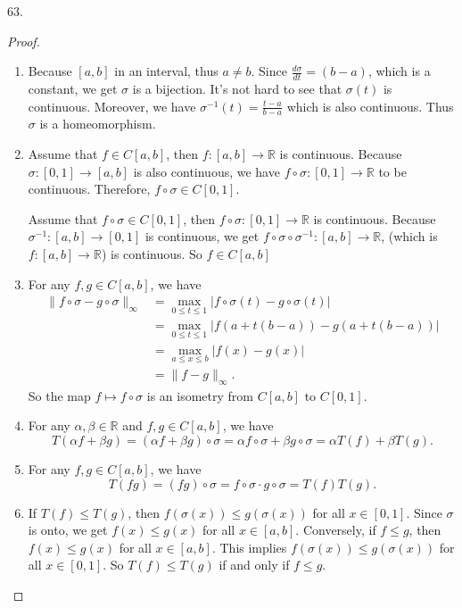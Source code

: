 \documentclass[12pt, a4paper]{article}
\theoremstyle{plain}
\newcommand{\R}{\mathbb{R}}
\begin{document}
\pagebreak

63.
\begin{proof}
\hfill

\begin{enumerate}[label=(\roman*)]
\item Because $[a,b]$ in an interval, thus $a\neq b$. Since $\frac{d\sigma}{dt}=(b-a)$, which is a constant, we get $\sigma$ is a bijection. It's not hard to see that $\sigma(t)$ is continuous. Moreover, we have $\sigma^{-1}(t)=\frac{t-a}{b-a}$ which is also continuous. Thus $\sigma$ is a homeomorphism.

\item Assume that $f\in C[a,b]$, then $f:[a,b]\rightarrow\R$ is continuous. Because $\sigma:[0,1]\rightarrow [a,b]$ is also continuous, we have $f\circ \sigma:[0,1]\rightarrow \R$ to be continuous. Therefore, $f\circ \sigma\in C[0,1]$. 

Assume that $f\circ\sigma\in C[0,1]$, then $f\circ\sigma:[0,1]\rightarrow \R$ is continuous. Because $\sigma^{-1}:[a,b]\rightarrow [0,1]$ is continuous, we get $f\circ\sigma\circ\sigma^{-1}:[a,b]\rightarrow\R$,  (which is $f:[a,b]\rightarrow\R$) is continuous. So $f\in C[a,b]$

\item For any $f,g\in C[a,b]$, we have
\begin{align*}
\|f\circ\sigma - g\circ\sigma\|_\infty &=\max_{0\leq t\leq 1}|f\circ \sigma(t)-g\circ\sigma (t)|\\
&=\max_{0\leq t\leq 1}|f(a+t(b-a))-g(a+t(b-a))|\\
&= \max_{a\leq x\leq b}|f(x)-g(x)|\\
&=\|f-g\|_\infty.
\end{align*}
So the map $f\mapsto f\circ\sigma$ is an isometry from $C[a,b]$ to $C[0,1]$.

\item For any $\alpha, \beta\in \R$ and $f,g\in C[a,b]$, we have
\[
T(\alpha f+\beta g)=(\alpha f+\beta g)\circ\sigma = \alpha f\circ \sigma+\beta g\circ\sigma=\alpha T(f)+\beta T(g).
\]

\item For any $f,g\in C[a,b]$, we have
\[
T(fg)=(fg)\circ\sigma=f\circ\sigma\cdot g\circ\sigma=T(f)T(g).
\]

\item If $T(f)\leq T(g)$, then $f(\sigma(x))\leq g(\sigma(x))$ for all $x\in [0,1]$. Since $\sigma$ is onto, we get $f(x)\leq g(x)$ for all $x\in [a,b]$. Conversely, if $f\leq g$, then $f(x)\leq g(x)$ for all $x\in [a,b]$. This implies $f(\sigma(x))\leq g(\sigma(x))$ for all $x\in [0,1]$. So $T(f)\leq T(g)$ if and only if $f\leq g$.
\end{enumerate}
\end{proof}
\end{document}
